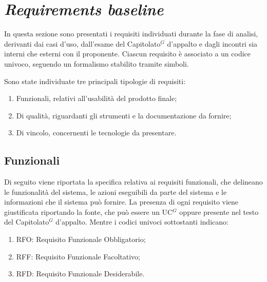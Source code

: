 \section{\textit{Requirements baseline}}

In questa sezione sono presentati i requisiti individuati durante la fase di analisi, derivanti dai casi d'uso, dall'esame del \gls{Capitolato}$^G$ d'appalto e dagli incontri
sia interni che esterni con il proponente. Ciascun requisito è associato a un codice univoco, seguendo un formalismo stabilito tramite simboli.

Sono state individuate tre principali tipologie di requisiti:
\begin{enumerate}
	\item Funzionali, relativi all'usabilità del prodotto finale;
	\item Di qualità, riguardanti gli strumenti e la documentazione da fornire;
	\item Di vincolo, concernenti le tecnologie da presentare.
\end{enumerate}

\subsection{Funzionali}

Di seguito viene riportata la specifica relativa ai requisiti funzionali, che delineano le funzionalità del sistema, le azioni eseguibili
da parte del sistema e le informazioni che il sistema può fornire. La presenza di ogni requisito viene giustificata riportando la fonte, che può essere un \gls{UC}$^G$ oppure presente
nel testo del \gls{Capitolato}$^G$ d'appalto. Mentre i codici univoci sottostanti indicano:
\begin{enumerate}
	\item RFO: Requisito Funzionale Obbligatorio;
	\item RFF: Requisito Funzionale Facoltativo;
	\item RFD: Requisito Funzionale Desiderabile.
\end{enumerate}


